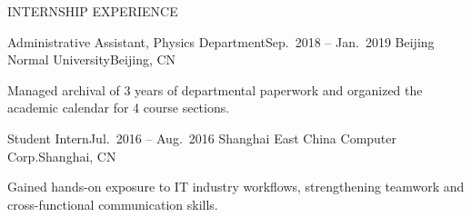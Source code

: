 \documentclass{resume} %
\begin{document}
\begin{rSection}{INTERNSHIP EXPERIENCE}

\begin{rSubsection}
{Administrative Assistant, Physics Department}{Sep.\ 2018 -- Jan.\ 2019}
{Beijing Normal University}{Beijing, CN}
\item Managed archival of 3 years of departmental paperwork and organized the academic calendar for 4 course sections.
\end{rSubsection}

\begin{rSubsection}
{Student Intern}{Jul.\ 2016 -- Aug.\ 2016}
{Shanghai East China Computer Corp.}{Shanghai, CN}
\item Gained hands-on exposure to IT industry workflows, strengthening teamwork and cross-functional communication skills.
\end{rSubsection}

\end{rSection}
\end{document}
